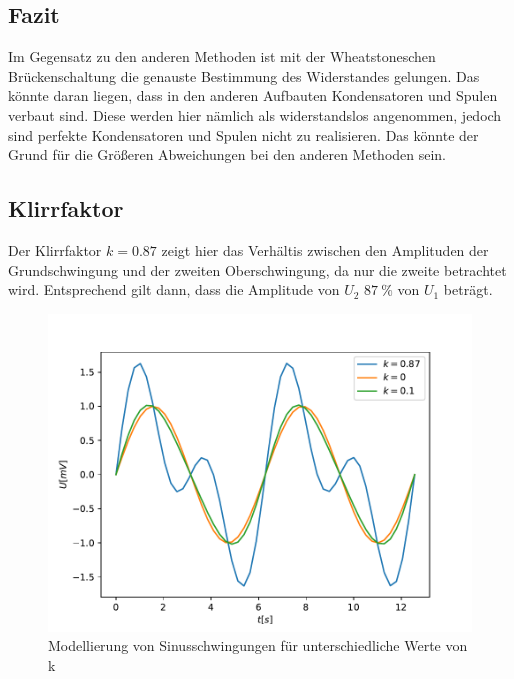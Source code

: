     \subsection{Fazit}
    Im Gegensatz zu den anderen Methoden ist mit der Wheatstoneschen Brückenschaltung die genauste Bestimmung des Widerstandes gelungen.
    Das könnte daran liegen, dass in den anderen Aufbauten Kondensatoren und Spulen verbaut sind. 
    Diese werden hier nämlich als widerstandslos angenommen, jedoch sind perfekte Kondensatoren und Spulen nicht zu realisieren.
    Das könnte der Grund für die Größeren Abweichungen bei den anderen Methoden sein.

    \subsection{Klirrfaktor}
    Der Klirrfaktor $k=0.87$ zeigt hier das Verhältis zwischen den Amplituden der Grundschwingung und der zweiten Oberschwingung,
    da nur die zweite betrachtet wird.
    Entsprechend gilt dann, dass die Amplitude von $U_2$ $\qty{87}{\percent}$ von $U_1$ beträgt.

    \begin{figure}
        \centering
        \includegraphics{./Klirr_Model.pdf}
        \caption{Modellierung von Sinusschwingungen für unterschiedliche Werte von k}
        \label{fig:klirr_mod}
    \end{figure}

